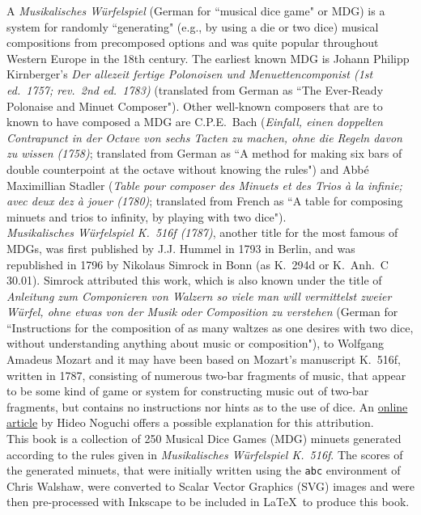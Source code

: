 \documentclass[letterpaper,x11names,svgnames,10pt]{article}
\begin{document}
A {\it Musikalisches W\"{u}rfelspiel} (German for ``musical dice game" or MDG) is a system for randomly ``generating" (e.g., by using a die or two dice) musical compositions from precomposed options and was quite popular throughout Western Europe in the 18th century.  The earliest known MDG is Johann Philipp Kirnberger's {\em Der allezeit fertige Polonoisen und Menuettencomponist (1st ed.\ 1757; rev.\ 2nd ed.\ 1783)} (translated from German as ``The Ever-Ready Polonaise and Minuet Composer").  Other well-known composers that are to known to have composed a MDG are C.P.E.\ Bach ({\em Einfall, einen doppelten Contrapunct in der Octave von sechs Tacten zu machen, ohne die Regeln davon zu wissen (1758)}; translated from German as ``A method for making six bars of double counterpoint at the octave without knowing the rules") and Abb\'{e} Maximillian Stadler ({\em Table pour composer des Minuets et des Trios \`{a} la infinie; avec deux dez \`{a} jouer (1780)}; translated from French as ``A table for composing minuets and trios to infinity, by playing with two dice").\\

{\it Musikalisches W\"{u}rfelspiel K.\ 516f (1787)}, another title for the most famous of MDGs, was first published by J.J. Hummel in 1793 in Berlin, and was republished in 1796 by Nikolaus Simrock in Bonn (as K.\ 294d or K.\ Anh.\ C 30.01).  Simrock attributed this work, which is also known under the title of {\em Anleitung zum Componieren von Walzern so viele man will vermittelst zweier W\"{u}rfel, ohne etwas von der Musik oder Composition zu verstehen} (German for ``Instructions for the composition of as many waltzes as one desires with two dice, without understanding anything about music or composition"), to Wolfgang Amadeus Mozart and it may have been based on Mozart's manuscript K.\ 516f, written in 1787, consisting of numerous two-bar fragments of music, that appear to be some kind of game or system for constructing music out of two-bar fragments, but contains no instructions nor hints as to the use of dice.  An \href{(http://www.asahi-net.or.jp/\~rb5h-ngc/e/k516f.htm}{online article} by Hideo Noguchi offers a possible explanation for this attribution. \\

This book is a collection of 250 Musical Dice Games (MDG) minuets generated according to the rules given in {\it Musikalisches W\"{u}rfelspiel K.\ 516f}.  The scores of the generated minuets, that were initially written using the \texttt{abc} environment of Chris Walshaw, were converted to Scalar Vector Graphics (SVG) images and were then pre-processed with Inkscape to be included in \LaTeX\ to produce this book.
\end{document}
